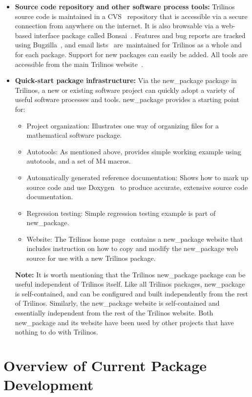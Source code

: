 \documentclass[acmtoms,acmnow]{acmtrans2m}
\begin{document}
\begin{itemize}
\item {\bf Source code repository and other software process tools:}
Trilinos source code is
maintained in a CVS~\cite{CVS} repository that is accessible via a
secure connection from anywhere on the internet.  It is also browsable
via a web-based interface package called Bonsai~\cite{Bonsai}.  Features 
and bug reports are tracked using Bugzilla~\cite{Bugzilla}, and email 
lists~\cite{Mailman} are\
maintained for Trilinos as a whole and for each package.  Support for new
packages can easily be added.  All tools are accessible from the main
Trilinos website~\cite{Trilinos-home-page}.

\item {\bf Quick-start package infrastructure:} Via the new\_package package in
Trilinos, a new or existing software project can quickly adopt a
variety of useful software processes and tools.  new\_package provides a
starting point for:
\begin{itemize}
\item Project organization:  Illustrates one way of
organizing files for a mathematical software package.
\item Autotools: As mentioned above, provides simple working example
using autotools, and a set of M4 macros.
\item Automatically generated reference documentation: Shows how
to mark up source code and use Doxygen~\cite{Doxygen} to produce
accurate, extensive source code documentation.
\item Regression testing: Simple regression testing example is part of
new\_package.
\item Website: The Trilinos home page~\cite{Trilinos-home-page}
contains a new\_package website that includes instruction on how to
copy and modify the new\_package web source for use with a new
Trilinos package.
\end{itemize}

{\bf Note:} It is worth mentioning that the Trilinos new\_package package can be
useful independent of Trilinos itself.  Like all Trilinos packages,
new\_package is self-contained, and can be configured and
built independently from the rest of Trilinos.  Similarly, the
new\_package website is self-contained and essentially independent
from the rest of the Trilinos website.  Both new\_package and its
website have been used by other projects that have nothing to do with Trilinos.
\end{itemize}


\section{Overview of Current Package Development}
\label{sect:Software}
\end{document}
